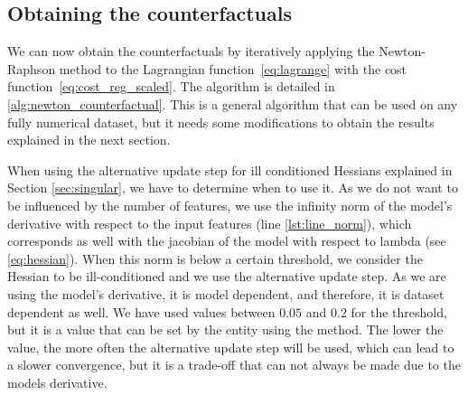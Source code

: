 \documentclass[12pt]{extarticle}
\numberwithin{equation}{section}
\begin{document}
\subsection{Obtaining the counterfactuals}\label{sec:obtaining_counterfactuals}
We can now obtain the counterfactuals by iteratively applying the Newton-Raphson method to the Lagrangian function~\eqref{eq:lagrange} with the cost function~\eqref{eq:cost_reg_scaled}. The algorithm is detailed in \autoref{alg:newton_counterfactual}. This is a general algorithm that can be used on any fully numerical dataset, but it needs some modifications to obtain the results explained in the next section.

When using the alternative update step for ill conditioned Hessians explained in Section \ref{sec:singular}, we have to determine when to use it. As we do not want to be influenced by the number of features, we use the infinity norm of the model's derivative with respect to the input features (line \ref{lst:line_norm}), which corresponds as well with the jacobian of the model with respect to lambda (see \eqref{eq:hessian}). When this norm is below a certain threshold, we consider the Hessian to be ill-conditioned and we use the alternative update step. As we are using the model's derivative, it is model dependent, and therefore, it is dataset dependent as well. We have used values between $0.05$ and $0.2$ for the threshold, but it is a value that can be set by the entity using the method. The lower the value, the more often the alternative update step will be used, which can lead to a slower convergence, but it is a trade-off that can not always be made due to the models derivative.
\end{document}
